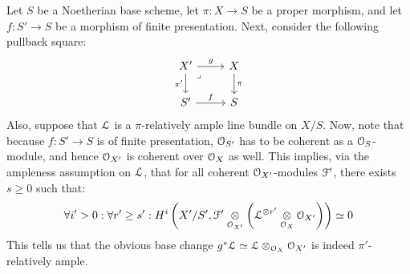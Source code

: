                     \begin{remark} \label{remark: base_changing_ample_line_bundles}
                        Let $S$ be a Noetherian base scheme, let $\pi: X \to S$ be a proper morphism, and let $f: S' \to S$ be a morphism of finite presentation. Next, consider the following pullback square:
                            $$
                                \begin{tikzcd}
                                	{X'} & X \\
                                	{S'} & S
                                	\arrow["g", from=1-1, to=1-2]
                                	\arrow["{\pi'}"', from=1-1, to=2-1]
                                	\arrow["\pi", from=1-2, to=2-2]
                                	\arrow["f", from=2-1, to=2-2]
                                	\arrow["\lrcorner"{anchor=center, pos=0.125}, draw=none, from=1-1, to=2-2]
                                \end{tikzcd}
                            $$
                        Also, suppose that $\mathcal{L}$ is a $\pi$-relatively ample line bundle on $X/S$. Now, note that because $f: S' \to S$ is of finite presentation, $\mathcal{O}_{S'}$ has to be coherent as a $\mathcal{O}_S$-module, and hence $\mathcal{O}_{X'}$ is coherent over $\mathcal{O}_X$ as well. This implies, via the ampleness assumption on $\mathcal{L}$, that for all coherent $\mathcal{O}_{X'}$-modules $\mathcal{F}'$, there exists $s \geq 0$ such that:
                            $$\forall i' > 0: \forall r' \geq s': H^i\left(X'/S', \calF' \tensor_{\calO_{X'}} \left(\calL^{\tensor r'} \tensor_{\calO_X} \calO_{X'}\right)\right) \cong 0$$
                        This tells us that the obvious base change $g^*\calL \cong \calL \tensor_{\calO_X} \calO_{X'}$ is indeed $\pi'$-relatively ample.
                    \end{remark}
                    
